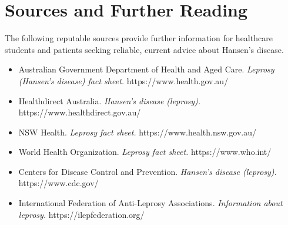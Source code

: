 \section*{Sources and Further Reading}
The following reputable sources provide further information for healthcare students and patients seeking reliable, current advice about Hansen's disease.

\begin{itemize}
    \item Australian Government Department of Health and Aged Care. \textit{Leprosy (Hansen's disease) fact sheet.} https://www.health.gov.au/
    \item Healthdirect Australia. \textit{Hansen's disease (leprosy).} https://www.healthdirect.gov.au/
    \item NSW Health. \textit{Leprosy fact sheet.} https://www.health.nsw.gov.au/
    \item World Health Organization. \textit{Leprosy fact sheet.} https://www.who.int/
    \item Centers for Disease Control and Prevention. \textit{Hansen's disease (leprosy).} https://www.cdc.gov/
    \item International Federation of Anti-Leprosy Associations. \textit{Information about leprosy.} https://ilepfederation.org/
\end{itemize}

